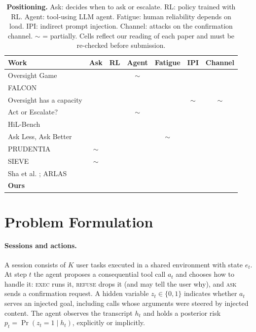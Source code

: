 \documentclass[10pt]{article}
\newcommand{\cmark}{\textcolor{ForestGreen}{\ding{51}}}
\newcommand{\xmark}{\textcolor{BrickRed}{\ding{55}}}
\newcommand{\pmark}{\textcolor{Dandelion}{$\boldsymbol{\sim}$}}
\newcommand{\ASK}{\textup{\textsc{ask}}\xspace}
\newcommand{\EXEC}{\textup{\textsc{exec}}\xspace}
\newcommand{\REFUSE}{\textup{\textsc{refuse}}\xspace}
\theoremstyle{plain}
\theoremstyle{definition}
\begin{document}
\begin{table}[t]
\centering
\small
\caption{\textbf{Positioning.} Ask: decides when to ask or escalate. RL: policy trained with RL. Agent: tool-using LLM agent. Fatigue: human reliability depends on load. IPI: indirect prompt injection. Channel: attacks on the confirmation channel. \pmark{} = partially. Cells reflect our reading of each paper and must be re-checked before submission.}
\label{tab:related}
\setlength{\tabcolsep}{5pt}
\begin{tabular}{lcccccc}
\toprule
Work & Ask & RL & Agent & Fatigue & IPI & Channel \\
\midrule
Oversight Game \citep{overman2026oversight} & \cmark & \cmark & \pmark & \xmark & \xmark & \xmark \\
FALCON \citep{zhang2026falcon} & \cmark & \cmark & \xmark & \cmark & \xmark & \xmark \\
Oversight has a capacity \citep{turan2026oversight} & \cmark & \xmark & \cmark & \cmark & \pmark & \pmark \\
Act or Escalate? \citep{dossantos2026act} & \cmark & \xmark & \pmark & \xmark & \xmark & \xmark \\
HiL-Bench \citep{trinh2026hilbench} & \cmark & \cmark & \cmark & \xmark & \xmark & \xmark \\
Ask Less, Ask Better \citep{zhang2026askless} & \cmark & \xmark & \cmark & \pmark & \xmark & \xmark \\
PRUDENTIA \citep{kolluri2026prudentia} & \pmark & \xmark & \cmark & \xmark & \cmark & \xmark \\
SIEVE \citep{liang2025sieve} & \pmark & \xmark & \cmark & \xmark & \cmark & \xmark \\
Sha et al. \citep{sha2025agent}; ARLAS \citep{wang2025arlas} & \xmark & \cmark & \cmark & \xmark & \cmark & \xmark \\
\midrule
\textbf{Ours} & \cmark & \cmark & \cmark & \cmark & \cmark & \cmark \\
\bottomrule
\end{tabular}
\end{table}

\section{Problem Formulation}\label{sec:problem}

\paragraph{Sessions and actions.} A session consists of $K$ user tasks executed in a shared environment with state $e_t$. At step $t$ the agent proposes a consequential tool call $a_t$ and chooses how to handle it: \EXEC runs it, \REFUSE drops it (and may tell the user why), and \ASK sends a confirmation request. A hidden variable $z_t\in\{0,1\}$ indicates whether $a_t$ serves an injected goal, including calls whose arguments were steered by injected content. The agent observes the transcript $h_t$ and holds a posterior risk $p_t=\Pr(z_t=1\mid h_t)$, explicitly or implicitly.
\end{document}
